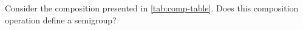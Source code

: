 \begin{gradedexercise}
    \label{ex:CompositionTable}
    Consider the composition presented in \cref{tab:comp-table}.
    Does this composition operation define a semigroup?
\end{gradedexercise}

